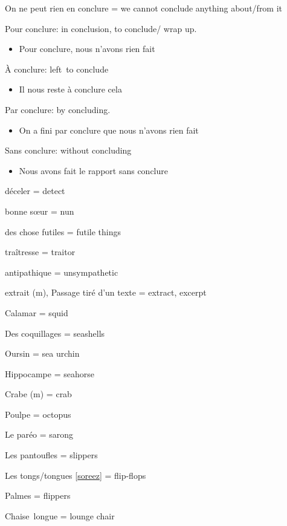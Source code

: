 On ne peut rien en conclure = we cannot conclude anything about/from it

Pour conclure: in conclusion, to conclude/ wrap up.~

\begin{itemize}
\item
  Pour conclure, nous n'avons rien fait~
\end{itemize}

À conclure: left~to conclude~

\begin{itemize}
\item
  Il nous reste à conclure cela~
\end{itemize}

Par conclure: by concluding.

\begin{itemize}
\item
  On a fini par conclure que nous n'avons rien fait~
\end{itemize}

Sans conclure: without concluding~

\begin{itemize}
\item
  Nous avons fait le rapport sans conclure~
\end{itemize}

déceler = detect

bonne sœur = nun

des chose futiles = futile things

traîtresse = traitor

antipathique = unsympathetic

extrait (m), Passage tiré d'un texte = extract, excerpt

Calamar = squid~

Des coquillages = seashells~

Oursin = sea urchin~

Hippocampe = seahorse~

Crabe (m) = crab

Poulpe = octopus~

Le paréo = sarong~

Les pantoufles = slippers~

Les tongs/tongues
{[}\href{https://soreez.com/blogs/blog/tong-ou-tongue-quelle-est-la-bonne-orthographe}{soreez}{]}
= flip-flops~

Palmes = flippers~

Chaise~longue = lounge chair~

